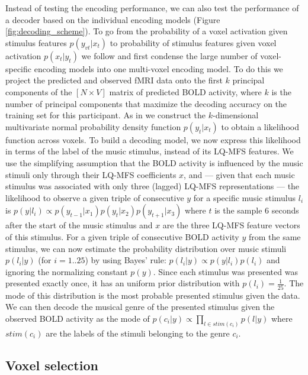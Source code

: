 Instead of testing the encoding performance, we can also test the performance
of a decoder based on the individual encoding models \citep{NG11} (Figure
\ref{fig:decoding_scheme}). To go from the probability of a voxel activation
given stimulus features $p(y_{vt}|x_{t})$ to probability of stimulus features
given voxel activation $p(x_{t}|y_{t})$ we follow \citet{NG09} and first
condense the large number of voxel-specific encoding models into one
multi-voxel encoding model.  To do this we project the predicted and observed
f{MRI} data onto the first $k$ principal components of the $[N\times V]$ matrix
of predicted BOLD activity, where $k$ is the number of principal components
that maximize the decoding accuracy on the training set for this participant.
As in \citet{NG09} we construct the $k$-dimensional multivariate normal
probability density function $p(y_{t}|x_{t})$ to obtain a likelihood function
across voxels.  To build a decoding model, we now express this likelihood in
terms of the label of the music stimulus, instead of its LQ-MFS features.  We
use the simplifying assumption that the BOLD activity is influenced by the
music stimuli only through their LQ-MFS coefficients $x$, and --- given that
each music stimulus was associated with only three (lagged) LQ-MFS
representations --- the likelihood to observe a given triple of consecutive $y$
for a specific music stimulus $l_{i}$ is $p(y|l_{i}) \propto
p(y_{t-1}|x_{1})p(y_{t}|x_{2})p(y_{t+1}|x_{3})$ where $t$ is the sample 6
seconds after the start of the music stimulus and $x$ are the three LQ-MFS
feature vectors of this stimulus.  For a given triple of consecutive BOLD
activity $y$ from the same stimulus, we can now estimate the probability
distribution over music stimuli $p(l_{i}|y)$ (for $i=1..25$) by using Bayes'
rule: $p(l_{i}|y) \propto p(y|l_{i})p(l_{i})$ and ignoring the normalizing
constant $p(y)$. Since each stimulus was presented was presented exactly once,
it has an uniform prior distribution with $p(l_{i})=\frac{1}{25}$. The mode of
this distribution is the most probable presented stimulus given the data.  We
can then decode the musical genre of the presented stimulus given the observed
BOLD activity as the mode of $p(c_{i}|y) \propto \prod\nolimits_{l \in
  stim(c_{i})} p(l|y)$ where $stim(c_{i})$ are the labels of the stimuli
  belonging to the genre $c_{i}$. 

\subsection*{Voxel selection}

